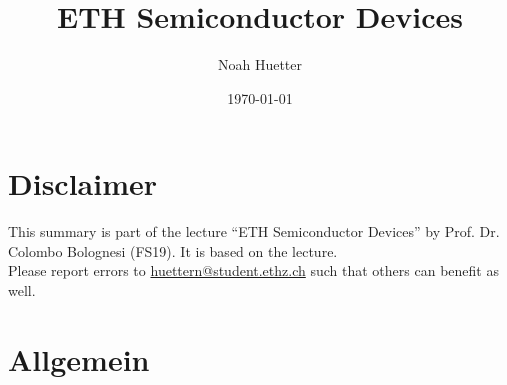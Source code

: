 \documentclass[a4paper, fontsize=8pt, landscape, DIV=1]{scrartcl}
\title{ETH Semiconductor Devices}
\author{Noah Huetter}
\date{\today}
\begin{document}
\setcounter{secnumdepth}{2} %
\begin{multicols*}{4}
	\section*{Disclaimer}
	This summary is part of the lecture ``ETH Semiconductor Devices'' by Prof. Dr. Colombo Bolognesi (FS19). It is based on the lecture. \\[6pt]
	Please report errors to \href{mailto:huettern@student.ethz.ch}{huettern@student.ethz.ch} such that others can benefit as well.\\			
	\vfill\null
	\pagebreak
  \maketitle 
  \thispagestyle{fancy}

  \section{Allgemein}        


\end{multicols*}
\end{document}
